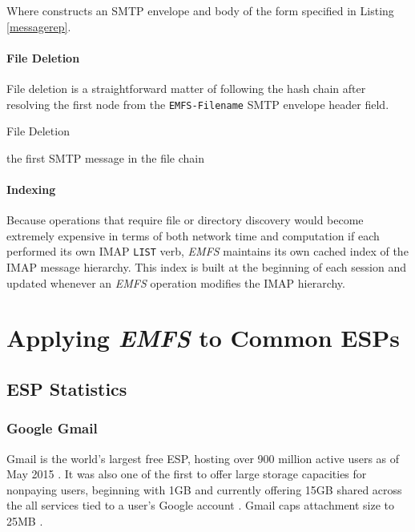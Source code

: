 \documentclass[12pt]{article}
\begin{document}
Where  constructs an SMTP envelope and body of the form
specified in Listing \ref{messagerep}.

\paragraph{File Deletion}

File deletion is a straightforward matter of following the hash chain after
resolving the first node from the \texttt{EMFS-Filename} SMTP envelope header
field.

\begin{algorithm}
\caption{File Deletion}
\begin{algorithmic}[1]
\State  the first SMTP message in the file chain
\Do
\State 
\State 
\State 
\doWhile{}
\EndProcedure
\end{algorithmic}
\end{algorithm}

\paragraph{Indexing}

Because operations that require file or directory discovery would become
extremely expensive in terms of both network time and computation if each
performed its own IMAP \texttt{LIST} verb, \textit{EMFS} maintains its own
cached index of the IMAP message hierarchy. This index is built at the beginning
of each session and updated whenever an \textit{EMFS} operation modifies the
IMAP hierarchy.

\section{Applying \textit{EMFS} to Common ESPs}

\subsection{ESP Statistics}

\subsubsection{Google Gmail}

Gmail is the world's largest free ESP, hosting over 900 million active users
as of May 2015 \cite{gmail:01}. It was also one of the first to offer large
storage capacities for nonpaying users, beginning with 1GB and currently
offering 15GB shared across the all services tied to a user's Google account
\cite{kuchinskas, gmail:02}. Gmail caps attachment size to 25MB
\cite{google:01}.
\end{document}
